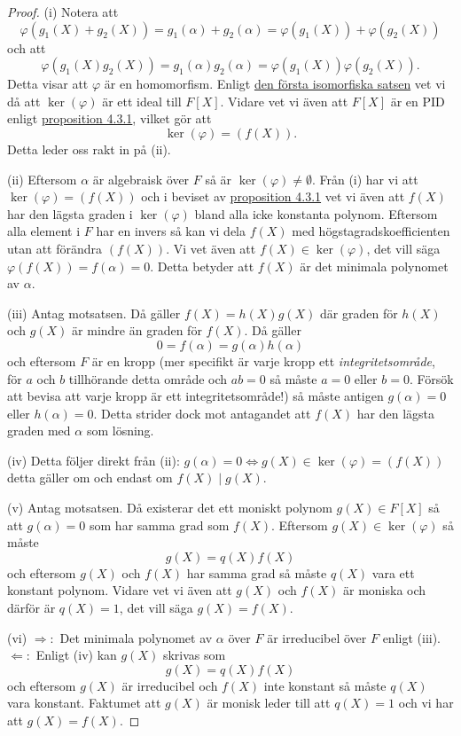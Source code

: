\documentclass{article}
\theoremstyle{definition}
\begin{document}
\begin{proof}
  (i) Notera att 
  \[\varphi(g_1(X) + g_2(X)) = g_1(\alpha) + g_2(\alpha) = \varphi(g_1(X)) + \varphi(g_2(X))\]
  och att 
  \[\varphi(g_1(X) g_2(X)) = g_1(\alpha) g_2(\alpha) = \varphi(g_1(X)) \varphi(g_2(X)).\]
  Detta visar att $\varphi$ är en homomorfism. Enligt \hyperlink{isomorfiska}{den första isomorfiska satsen} vet vi då att $\ker(\varphi)$ är ett ideal 
  till $F[X]$. Vidare vet vi även att $F[X]$ är en PID enligt \hyperlink{pid}{proposition 4.3.1}, vilket gör att 
  \[\ker(\varphi) = (f(X)).\]
  Detta leder oss rakt in på (ii).

  (ii) Eftersom $\alpha$ är algebraisk över $F$ så är $\ker(\varphi) \neq \emptyset$. Från (i) har vi att $\ker(\varphi) = (f(X))$
  och i beviset av \hyperlink{pid}{proposition 4.3.1} vet vi även att $f(X)$ har den lägsta graden i $\ker(\varphi)$ bland alla icke konstanta polynom. 
  Eftersom alla element i $F$ har en invers så kan vi dela $f(X)$ med högstagradskoefficienten utan att förändra $(f(X))$. Vi vet även att 
  $f(X) \in \ker(\varphi)$, det vill säga $\varphi(f(X)) = f(\alpha) = 0$. Detta betyder att $f(X)$ är det minimala polynomet av $\alpha$.

  (iii) Antag motsatsen. Då gäller $f(X) = h(X)g(X)$ där graden för $h(X)$ och $g(X)$ är mindre än graden för $f(X)$. Då gäller 
  \[0 = f(\alpha) = g(\alpha) h(\alpha)\]
  och eftersom $F$ är en kropp (mer specifikt är varje kropp ett \textit{integritetsområde}, för $a$ och $b$ tillhörande detta område och 
  $ab = 0$ så måste $a = 0$ eller $b = 0$. Försök att bevisa att varje kropp är ett integritetsområde!) så måste antigen 
  $g(\alpha) = 0$ eller $h(\alpha) = 0$. Detta strider dock mot antagandet att $f(X)$ har den lägsta graden med $\alpha$ som lösning. 

  (iv) Detta följer direkt från (ii): $g(\alpha) = 0 \iff g(X) \in \ker(\varphi) = (f(X))$ detta gäller om och endast om $f(X) \; | \; g(X).$ 
  
  (v) Antag motsatsen. Då existerar det ett moniskt polynom $g(X) \in F[X]$ så att $g(\alpha) = 0$ som har samma grad som $f(X)$. 
  Eftersom $g(X) \in \ker(\varphi)$ så måste 
  \[g(X) = q(X) f(X)\]
  och eftersom $g(X)$ och $f(X)$ har samma grad så måste $q(X)$ vara ett konstant polynom. Vidare vet vi även att $g(X)$ och $f(X)$ är moniska 
  och därför är $q(X) = 1$, det vill säga $g(X) = f(X)$.

  (vi) $\Rightarrow:$ Det minimala polynomet av $\alpha$ över $F$ är irreducibel över $F$ enligt (iii). 
  $\Leftarrow:$ Enligt (iv) kan $g(X)$ skrivas som 
  \[g(X) = q(X)f(X)\]
  och eftersom $g(X)$ är irreducibel och $f(X)$ inte konstant så måste $q(X)$ vara konstant. Faktumet att $g(X)$ är monisk leder till att 
  $q(X) = 1$ och vi har att $g(X) = f(X).$
\end{proof}
\end{document}
